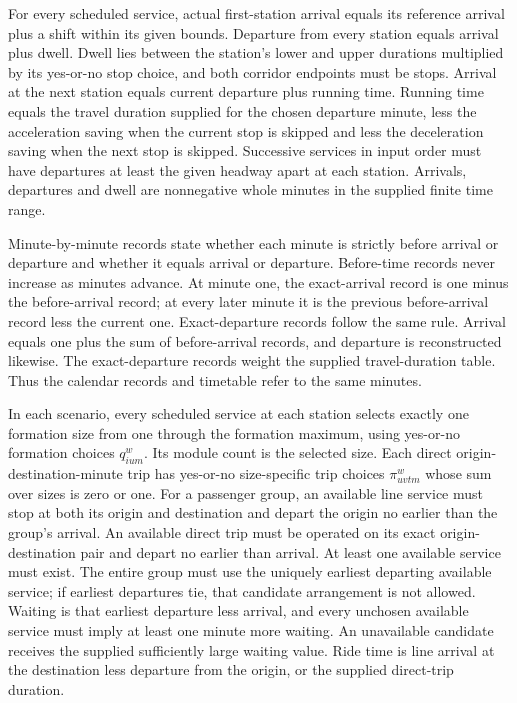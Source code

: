 \documentclass[10pt]{article}
\begin{document}
For every scheduled service, actual first-station arrival equals its reference arrival plus a shift within its given bounds. Departure from every station equals arrival plus dwell. Dwell lies between the station's lower and upper durations multiplied by its yes-or-no stop choice, and both corridor endpoints must be stops. Arrival at the next station equals current departure plus running time. Running time equals the travel duration supplied for the chosen departure minute, less the acceleration saving when the current stop is skipped and less the deceleration saving when the next stop is skipped. Successive services in input order must have departures at least the given headway apart at each station. Arrivals, departures and dwell are nonnegative whole minutes in the supplied finite time range.

Minute-by-minute records state whether each minute is strictly before arrival or departure and whether it equals arrival or departure. Before-time records never increase as minutes advance. At minute one, the exact-arrival record is one minus the before-arrival record; at every later minute it is the previous before-arrival record less the current one. Exact-departure records follow the same rule. Arrival equals one plus the sum of before-arrival records, and departure is reconstructed likewise. The exact-departure records weight the supplied travel-duration table. Thus the calendar records and timetable refer to the same minutes.

In each scenario, every scheduled service at each station selects exactly one formation size from one through the formation maximum, using yes-or-no formation choices $q_{ium}^w$. Its module count is the selected size. Each direct origin-destination-minute trip has yes-or-no size-specific trip choices $\pi_{uvtm}^w$ whose sum over sizes is zero or one. For a passenger group, an available line service must stop at both its origin and destination and depart the origin no earlier than the group's arrival. An available direct trip must be operated on its exact origin-destination pair and depart no earlier than arrival. At least one available service must exist. The entire group must use the uniquely earliest departing available service; if earliest departures tie, that candidate arrangement is not allowed. Waiting is that earliest departure less arrival, and every unchosen available service must imply at least one minute more waiting. An unavailable candidate receives the supplied sufficiently large waiting value. Ride time is line arrival at the destination less departure from the origin, or the supplied direct-trip duration.
\end{document}
